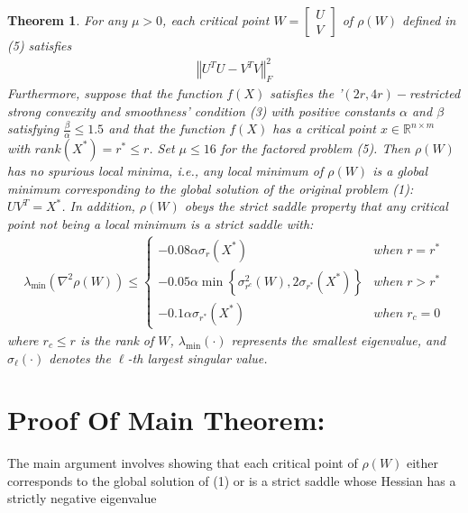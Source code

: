 \documentclass{article}
\newtheorem{theorem}{Theorem}
\begin{document}
\begin{theorem}
For any $\mu > 0$, each critical point $W=\left[\begin{array}{c}
U\\
V
\end{array}\right]$ of $\rho(W)$ defined in (5) satisfies 
\begin{align}
    \left\Vert U^TU-V^TV\right\Vert^2_F
\end{align}
Furthermore, suppose that the function $f(X)$ satisfies the '$(2r, 4r)-$restricted strong convexity and smoothness' condition (3) with positive constants $\alpha$ and $\beta$ satisfying $\frac{\beta}{\alpha} \le 1.5$ and that the function $f(X)$ has a critical point $x\in \mathbb{R}^{n\times m}$ with $rank(X^*) = r^* \le r$. Set $\mu \le 16$ for the factored problem (5). Then $\rho(W)$ has no spurious local minima, i.e., any local
minimum of $\rho(W)$ is a global minimum corresponding to the global solution of the original problem (1): $UV^T = X^*$. In addition, $\rho(W)$ obeys the strict saddle property that any critical point not being a local minimum is a strict saddle with:
\begin{align}
        \lambda_{\min}\left(\nabla^{2}\rho\left(W\right)\right)\le\begin{cases}
-0.08\alpha\sigma_r\left(X^{*}\right) & when\;r=r^{*}\\
-0.05\alpha\min\left\{ \sigma^2_{r^c}\left(W\right),2\sigma_{r^*}\left(X^{*}\right)\right\}  & when\;r> r^{*}\\
-0.1\alpha\sigma_{r^*}\left(X^{*}\right) & when\;r_c=0
\end{cases}
\end{align}
where $r_c \le r$ is the rank of $W$, $\lambda_{\min}\left(\cdot\right)$ represents the smallest eigenvalue, and $\sigma_{\ell}\left(\cdot\right)$ denotes the $\ell$-th largest singular value.

\end{theorem}


\section{Proof Of Main Theorem:}
The  main  argument  involves  showing  that  each  critical  point
of $\rho\left(W\right)$ either corresponds to the global solution of (1) or is a strict saddle whose Hessian has a strictly negative eigenvalue


\end{document}
